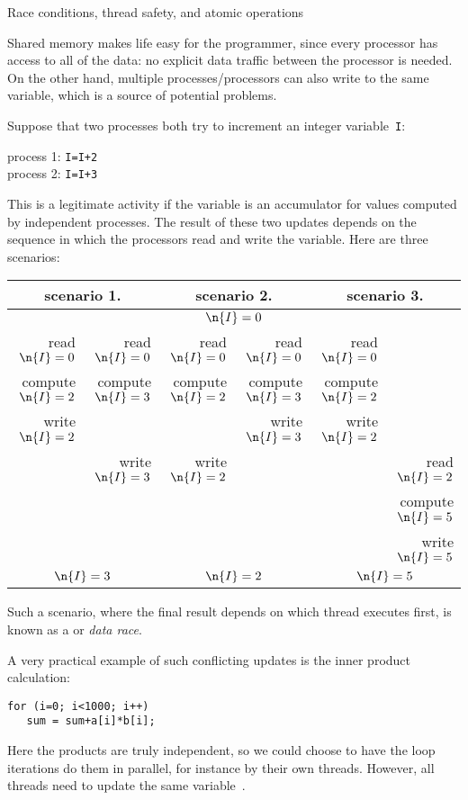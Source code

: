 
 {Race conditions, thread safety, and atomic operations}
\label{sec:shared-lock}

Shared memory makes life easy for the programmer, since every
processor has access to all of the data: no explicit data traffic
between the processor is needed. On the other hand, multiple
processes/processors can also write to the same variable, which is a
source of potential problems.

Suppose that two processes both try to increment an integer
variable~\texttt{I}:
\begin{tabbing}
  process 1: \texttt{I=I+2}\\
  process 2: \texttt{I=I+3}
\end{tabbing}
This is a legitimate activity if the variable is an accumulator for
values computed by independent processes.
The result of these two updates
depends on the sequence in which the processors read and
write the variable. Here are three scenarios:

\begin{tabular}{|rr|rr|rr|}
  \hline
  \multicolumn{2}{|c|}{scenario 1.}& \multicolumn{2}{|c|}{scenario 2.}&
  \multicolumn{2}{|c|}{scenario 3.}\\ \hline
  \multicolumn{6}{|c|}{$\n{I}=0$}\\ \hline
  read $\n{I}=0$&read $\n{I}=0$&
    read $\n{I}=0$&read $\n{I}=0$&
      read $\n{I}=0$& \\
  compute $\n{I}=2$&compute $\n{I}=3$& 
    compute $\n{I}=2$&compute $\n{I}=3$&
      compute $\n{I}=2$& \\
  write $\n{I}=2$& & &write $\n{I}=3$&write $\n{I}=2$& \\
  &write $\n{I}=3$&write $\n{I}=2$& & &read $\n{I}=2$\\
  &&&&&compute $\n{I}=5$\\
  &&&&&write $\n{I}=5$\\
  \hline
  \multicolumn{2}{|c|}{$\n{I}=3$}& \multicolumn{2}{|c|}{$\n{I}=2$}&
  \multicolumn{2}{|c|}{$\n{I}=5$}\\ \hline
\end{tabular}
Such a scenario, where the final result depends on which thread
executes first, is known as a  or
\emph{data race}.

A very practical example of such conflicting updates is the inner
product calculation:
\begin{verbatim}
for (i=0; i<1000; i++)
   sum = sum+a[i]*b[i];
\end{verbatim}
Here the products are truly independent, so we could choose to have
the loop iterations do them in parallel, for instance by their own
threads. However, all threads need to update the same variable~.

